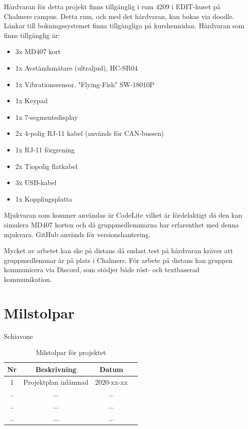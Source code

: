 \documentclass[a4paper]{article}
\begin{document}
Hårdvaran för detta projekt finns tillgänglig i rum 4209 i EDIT-huset på Chalmers campus. Detta rum, och med det hårdvaran, kan bokas via doodle. Länkar till bokningssystemet finna tillgängliga på kurshemsidan. Hårdvaran som finns tillgänglig är:

\begin{itemize}
    \item 3x MD407 kort
    \item 1x Avståndsmätare (ultraljud), HC-SR04
    \item 1x Vibrationssensor, "Flying-Fish" SW-18010P
    \item 1x Keypad
    \item 1x 7-segmentsdisplay
    \item 2x 4-polig RJ-11 kabel (används för CAN-bussen)
    \item 1x RJ-11 förgrening
    \item 2x Tiopolig flatkabel
    \item 3x USB-kabel
    \item 1x Kopplingsplatta
\end{itemize}

Mjukvaran som kommer användas är CodeLite vilket är fördelaktigt då den kan simulera MD407 korten och då gruppmedlemmarna har erfarenthet med denna mjukvara. GitHub används för versionshantering.

Mycket av arbetet kan ske på distans då endast test på hårdvaran kräver att gruppmedlemmar är på plats i Chalmers. För arbete på distans kan gruppen kommunicera via Discord, som stödjer både röst- och textbaserad kommunikation.

\section{Milstolpar}
Schiavone

\begin{table}[H]
    \begin{center}
        \begin{tabular}{ |c|c|c|c| }\hline
            Nr & Beskrivning & Datum \\\hline\hline
            1 & Projektplan inlämnad & 2020-xx-xx \\\hline
            .. & ... & ... \\\hline
            .. & ... & ... \\\hline
            .. & ... & ... \\\hline
        \end{tabular}
        \caption{Milstolpar för projektet}
        \label{milstolpar}
    \end{center}
\end{table}
\end{document}
